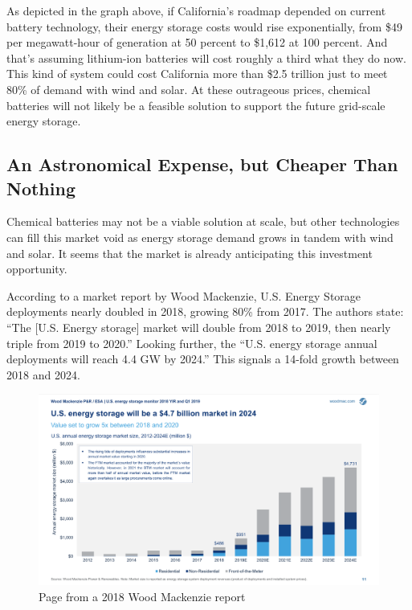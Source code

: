 \documentclass[hidelinks,12pt,a4paper]{article}
\begin{document}
As depicted in the graph above, if California's roadmap depended on current battery technology, their energy storage costs would rise exponentially, from \$49 per megawatt-hour of generation at 50 percent to \$1,612 at 100 percent. And that's assuming lithium-ion batteries will cost roughly a third what they do now. This kind of system could cost California more than \$2.5 trillion just to meet 80\% of demand with wind and solar. \cite{TheTwoPointFiveTrillionReasonWeCantRelyOnBatteries} At these outrageous prices, chemical batteries will not likely be a feasible solution to support the future grid-scale energy storage.

\subsection{An Astronomical Expense, but Cheaper Than Nothing}
Chemical batteries may not be a viable solution at scale, but other technologies can fill this market void as energy storage demand grows in tandem with wind and solar. It seems that the market is already anticipating this investment opportunity.

According to a market report by Wood Mackenzie, U.S. Energy Storage deployments nearly doubled in 2018, growing 80\% from 2017. \cite{USEnergyStorageMonitor2018YIRAndQ12019} The authors state: “The [U.S. Energy storage] market will double from 2018 to 2019, then nearly triple from 2019 to 2020.” Looking further, the “U.S. energy storage annual deployments will reach 4.4 GW by 2024.” This signals a 14-fold growth between 2018 and 2024.

\begin{figure}[ht!]
    \centering
    \includegraphics[width=1\textwidth]{US-ESM-2018-YIR-Executive-Summary-us-energy-storage-market-in-2024.png}
    \caption{Page from a 2018 Wood Mackenzie report \cite{USEnergyStorageMonitor2018YIRAndQ12019}}
\end{figure}
\FloatBarrier
\end{document}
